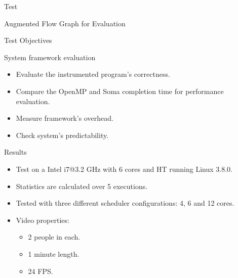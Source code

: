 \documentclass[xcolor=dvipsnames]{beamer}
\begin{document}
\begin{section}{Test}
\begin{frame}{\hskip 0.3cm Augmented Flow Graph for Evaluation}
\end{frame}











\begin{frame}{\hskip 0.3cm Test Objectives}


System framework evaluation

\begin{itemize}

\item Evaluate the instrumented program's correctness.

\item Compare the OpenMP and Soma completion time for performance evaluation.

\item Measure framework's overhead.

\item Check system's predictability.

\end{itemize}




\end{frame}







\begin{frame}{\hskip 0.3cm Results}
\vskip -1cm
\begin{itemize}

\item Test on a Intel i7@3.2 GHz with 6 cores and HT running Linux 3.8.0.

\item Statistics are calculated over 5 executions.

\item Tested with three different scheduler configurations: 4, 6 and 12 cores.

\item Video properties:

\begin{itemize}

\item 2 people in each.

\item 1 minute length.

\item 24 FPS.


\end{itemize}
\end{itemize}
\end{frame}
\end{section}
\end{document}
